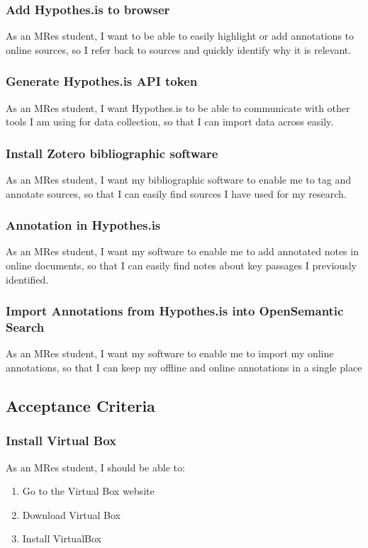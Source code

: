 \documentclass{article}
\begin{document}
\subsubsection*{Add Hypothes.is to browser}

As an MRes student, I want to be able to easily highlight or add annotations to online sources, so I refer back to sources and quickly identify why it is relevant.

\subsubsection*{Generate Hypothes.is API token}

As an MRes student, I want Hypothes.is to be able to communicate with other tools I am using for data collection, so that I can import data across easily.

\subsubsection*{Install Zotero bibliographic software}

As an MRes student, I want my bibliographic software to enable me to tag and annotate sources, so that I can easily find sources I have used for my research.

\subsubsection*{Annotation in Hypothes.is}

As an MRes student, I want my software to enable me to add annotated notes in online documents, so that I can easily find notes about key passages I previously identified.

\subsubsection*{Import Annotations from Hypothes.is into OpenSemantic Search}

As an MRes student, I want my software to enable me to import my online annotations, so that I can keep my offline and online annotations in a single place

\subsection*{Acceptance Criteria}

\subsubsection*{Install Virtual Box}
As an MRes student, I should be able to:
\begin{enumerate}
\item Go to the Virtual Box website
\item Download Virtual Box
\item Install VirtualBox
\end{enumerate}
\end{document}
